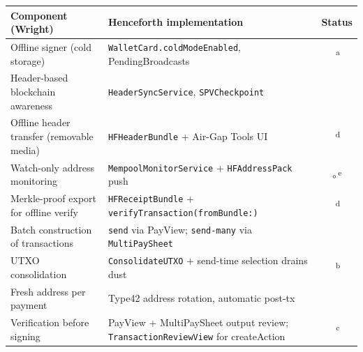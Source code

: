 \documentclass[a4paper, 11pt]{article}
\newcommand{\cmark}{\textcolor{forthGreen}{\ding{51}}}%
\begin{document}
\begin{center}
\begin{tabular}{@{} p{6.2cm} p{6.4cm} c @{}}
\toprule
\textbf{Component (Wright)}              & \textbf{Henceforth implementation}                       & \textbf{Status} \\
\midrule
Offline signer (cold storage)            & \texttt{WalletCard.coldModeEnabled}, PendingBroadcasts    & \cmark{}\,\textsuperscript{a} \\
Header-based blockchain awareness        & \texttt{HeaderSyncService}, \texttt{SPVCheckpoint}        & \cmark{} \\
Offline header transfer (removable media) & \texttt{HFHeaderBundle} + Air-Gap Tools UI                          & \cmark{}\,\textsuperscript{d} \\
Watch-only address monitoring            & \texttt{MempoolMonitorService} + \texttt{HFAddressPack} push        & $\circ$\,\textsuperscript{e} \\
Merkle-proof export for offline verify   & \texttt{HFReceiptBundle} + \texttt{verifyTransaction(fromBundle:)}   & \cmark{}\,\textsuperscript{d} \\
Batch construction of transactions       & \texttt{send} via PayView; \texttt{send-many} via \texttt{MultiPaySheet} & \cmark{} \\
UTXO consolidation                       & \texttt{ConsolidateUTXO} + send-time selection drains dust          & \cmark{}\,\textsuperscript{b} \\
Fresh address per payment                & Type42 address rotation, automatic post-tx                          & \cmark{} \\
Verification before signing              & PayView + MultiPaySheet output review; \texttt{TransactionReviewView} for createAction & \cmark{}\,\textsuperscript{c} \\
\bottomrule
\end{tabular}


\end{center}
\end{document}
